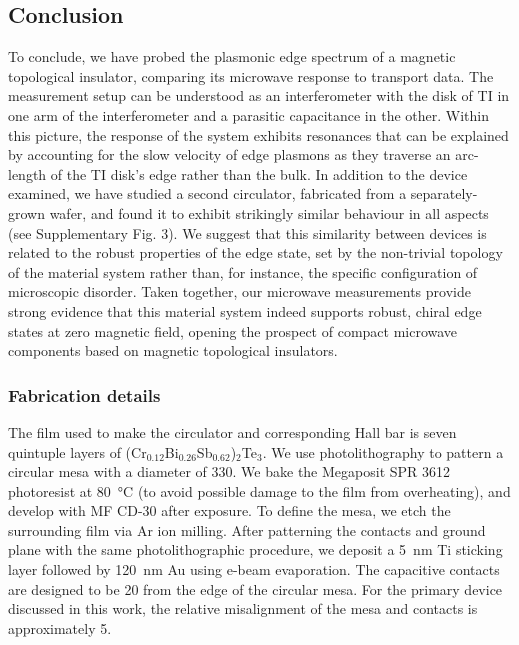 \subsection{Conclusion}
To conclude, we have probed the plasmonic edge spectrum of a magnetic topological insulator, comparing its microwave response to transport data. The measurement setup can be understood as an interferometer with the disk of TI in one arm of the interferometer and a parasitic capacitance in the other. Within this picture, the response of the system exhibits resonances that can be explained by accounting for the slow velocity of edge plasmons as they traverse an arc-length of the TI disk's edge rather than the bulk. In addition to the device examined, we have studied a second circulator, fabricated from a separately-grown wafer, and found it to exhibit strikingly similar behaviour in all aspects (see Supplementary Fig. 3). We suggest that this similarity between devices is related to the robust properties of the edge state, set by the non-trivial topology of the material system rather than, for instance, the specific configuration of microscopic disorder. Taken together, our microwave measurements provide strong evidence that this material system indeed supports robust, chiral edge states at zero magnetic field, opening the prospect of compact microwave components based on magnetic topological insulators. 

\subsubsection{Fabrication details} 
The film used to make the circulator and corresponding Hall bar is seven quintuple layers of (Cr$_{0.12}$Bi$_{0.26}$Sb$_{0.62}$)$_2$Te$_3$. We use photolithography to pattern a circular mesa with a diameter of \SI{330}{\micron}. We bake the Megaposit SPR 3612 photoresist at \SI{80}{\celsius} (to avoid possible damage to the film from overheating), and develop with MF CD-30 after exposure. To define the mesa, we etch the surrounding film via Ar ion milling. After patterning the contacts and ground plane with the same photolithographic procedure, we deposit a \SI{5}{\nano\meter} Ti sticking layer followed by \SI{120}{\nano\meter} Au using e-beam evaporation. The capacitive contacts are designed to be \SI{20}{\micron} from the edge of the circular mesa. For the primary device discussed in this work, the relative misalignment of the mesa and contacts is approximately \SI{5}{\micron}.

